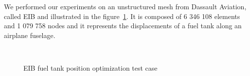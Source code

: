 \documentclass[10pt]{IOS-Book-Article}
\begin{document}
We performed our experiments on an unstructured mesh from Dassault Aviation, called EIB and illustrated in the figure~\ref{fig:reservoir}.
It is composed of 6 346 108 elements and 1 079 758 nodes and it represents the displacements of a fuel tank along an airplane fuselage.
\begin{figure}[htp]
 \centering
 \\
 \caption{EIB fuel tank position optimization test case}
 \label{fig:reservoir}
\end{figure}
\end{document}
